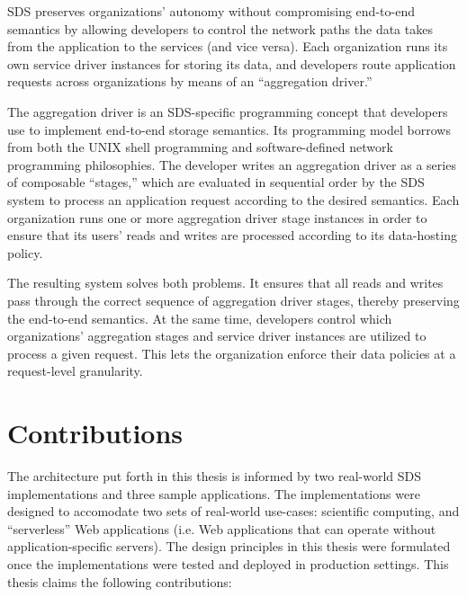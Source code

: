 SDS preserves organizations' autonomy without compromising end-to-end semantics by
allowing developers to control the network paths the data takes from the application to
the services (and vice versa).  Each organization runs its own
service driver instances for storing its data, and developers
route application requests across organizations by means of an ``aggregation driver.''

The aggregation driver is an SDS-specific programming concept that developers
use to implement end-to-end storage semantics.  Its
programming model borrows from both the UNIX shell programming and software-defined
network programming philosophies.  The developer writes an aggregation driver as a
series of composable ``stages,'' which are evaluated in sequential order by the
SDS system to process an application request according to the desired semantics.
Each organization runs one or more aggregation driver stage instances in order to ensure
that its users' reads and writes are processed according to its data-hosting
policy.

The resulting system solves both problems.
It ensures that all reads and writes pass through the
correct sequence of aggregation driver
stages, thereby preserving the end-to-end semantics.  At the same time, developers control
which organizations' aggregation stages and service driver
instances are utilized to process a given request.  This lets the organization
enforce their data policies at a request-level granularity.

\section{Contributions}

The architecture put forth in this thesis is informed by two real-world SDS
implementations and three sample applications.  The implementations were 
designed to accomodate two sets of real-world use-cases: scientific computing,
and ``serverless'' Web applications (i.e. Web applications that can operate
without application-specific servers).
The design principles in this thesis 
were formulated once the implementations were tested and
deployed in production settings.  This thesis claims the following contributions:

